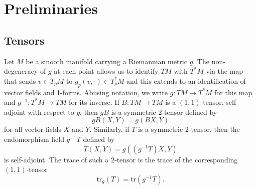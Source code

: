\documentclass{amsart}
\newcommand{\tr}{\mathrm{tr}}
\begin{document}
\section{Preliminaries}


\subsection{Tensors}

Let $M$ be a smooth manifold carrying a Riemannian metric $g$. 
The non-degeneracy of $g$ at each point allows us to identify $TM$ with $T^*M$ via the map that sends $v \in T_pM$ to $g_p(v,\cdot) \in T^*_pM$ and this extends to an identification of vector fields and 1-forms. 
Abusing notation, we write $g: TM \to T^*M$ for this map and $g^{-1}:T^*M \to TM$ for its inverse.
If $B:TM \to TM$ is a $(1,1)$-tensor, self-adjoint with respect to $g$, then $gB$ is a symmetric 2-tensor defined by
\[
gB(X,Y) = g(BX,Y)
\]
for all vector fields $X$ and $Y$.
Similarly, if $T$ is a symmetric 2-tensor, then the endomorphism field $g^{-1}T$ defined by 
\[
T(X,Y) = g( (g^{-1}T)X,Y)
\]
is self-adjoint.
The trace of such a $2$-tensor is the trace of the corresponding $(1,1)$-tensor
\[
\tr_g(T) = \tr(g^{-1}T).
\]
\end{document}
